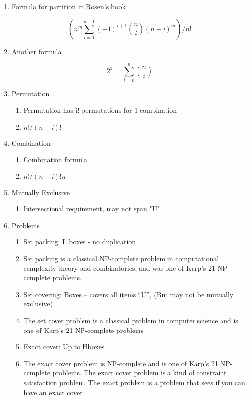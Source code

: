 \documentclass{article}
\begin{document}
\begin{enumerate}
\item Formula for partition in Rosen's book

$$(n^m \sum_{i=1}^{n-1} (-1) ^{i+1} {n \choose i} (n - i)^m)/n!$$

\item Another formula

$$2^n  = \sum_{i=n}^n {n \choose i} $$

\item Permutation 
\begin{enumerate}
    \item Permutation has i! permutations for 1 combination
    \item $ n!/(n-i)!$
\end{enumerate}

\item Combination
\begin{enumerate}
    \item Combination formula
    \item $n!/(n-i)! n$
\end{enumerate}

\item Mutually Exclusive
\begin{enumerate}
    \item Intersectional requirement, may not span "U"
\end{enumerate}

\item Problems
\begin{enumerate}
    \item Set packing: L boxes - no duplication
    \item Set packing is a classical NP-complete problem in computational complexity theory and combinatorics, and was one of Karp's 21 NP-complete problems.
    \item Set covering: Boxes – covers all items “U”, (But may not be mutually exclusive)
    \item The set cover problem is a classical problem in computer science and is one of Karp's 21 NP-complete problems
    \item Exact cover: Up to Hboxes
    \item The exact cover problem is NP-complete and is one of Karp's 21 NP-complete problems. The exact cover problem is a kind of constraint satisfaction problem. The exact problem is a problem that sees if you can have an exact cover.
\end{enumerate}

\end{enumerate}
\end{document}
